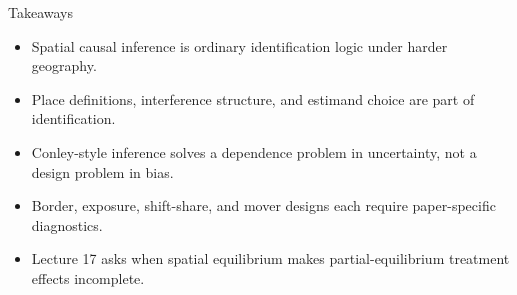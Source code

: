 \documentclass[aspectratio=169,11pt]{beamer}
\newcommand{\1}{\mathbf{1}}
\begin{document}
\begin{frame}{Takeaways}
\begin{itemize}
    \item Spatial causal inference is ordinary identification logic under harder geography.
    \item Place definitions, interference structure, and estimand choice are part of identification.
    \item Conley-style inference solves a dependence problem in uncertainty, not a design problem in bias.
    \item Border, exposure, shift-share, and mover designs each require paper-specific diagnostics.
    \item Lecture 17 asks when spatial equilibrium makes partial-equilibrium treatment effects incomplete.
\end{itemize}
\end{frame}
\end{document}
